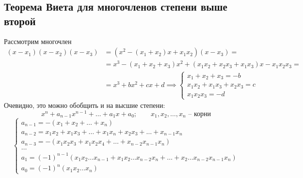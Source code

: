\documentclass[12pt, a4paper]{article}
\begin{document}
    \subsection{Теорема Виета для многочленов степени выше второй}
    Рассмотрим многочлен
    \begin{align*}
        (x - x_{1})(x - x_{2})(x - x_{3}) & = (x^2 - (x_{1} + x_{2})x + x_{1}x_{2})(x-x_{3}) = \\
                                          & = x^3 - (x_{1} + x_{2} + x_{3})x^2 + (x_{1}x_{2} + x_{2}x_{3} + x_{1}x_{3})x - x_{1}x_{2}x_{3} = \\
                                          & = x^3  + bx^2 + cx + d \implies \begin{cases}
                                            x_{1} + x_{2} + x_{3} = -b \\
                                            x_{1}x_{2} + x_{1}x_{3} + x_{2}x_{3} = c \\
                                            x_{1}x_{2}x_{3} = -d
                                          \end{cases}
    \end{align*}
    Очевидно, это можно обобщить и на высшие степени:\[
        x^{n} + a_{n-1}x^{n-1} + \ldots + a_{1}x + a_{0}; \qquad x_{1},x_{2},\ldots , x_{n} \text{ -- корни}  
    \]
    \[
        \begin{cases}
            a_{n-1} = - (x_{1} + x_{2} + \ldots  + x_{n}) \\
            a_{n-2} = x_{1}x_{2} + x_{1}x_{3} + \ldots + x_{1}x_{n} + x_{2}x_{3} + \ldots  + x_{n-1}x_{n}\\
            a_{n-3} = -(x_{1}x_{2}x_{3} + x_{1}x_{2}x_{4} + \ldots + x_{n-2}x_{n-1}x_{n})\\
            \ldots \\
            a_{1} = (-1)^{n-1} (x_{1}x_{2}\ldots x_{n-1} + x_{1}x_{2}\ldots x_{n-2}x_{n} + \ldots  + x_{2}\ldots x_{n-2}x_{n-1}x_{n})\\
            a_{0} = (-1)^{n}(x_{1}x_{2}\ldots x_{n}) 
        \end{cases}
    \] 
\end{document}
